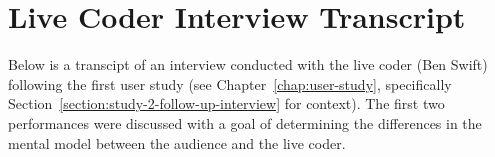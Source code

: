 \begin{center}
\end{center}

\chapter{Live Coder Interview Transcript}
\label{appendix:live-coder-interview-transcript}

Below is a transcipt of an interview conducted with the live coder (Ben Swift) following the first user study (see Chapter~\ref{chap:user-study}, specifically Section~\ref{section:study-2-follow-up-interview} for context). The first two performances were discussed with a goal of determining the differences in the mental model between the audience and the live coder.



